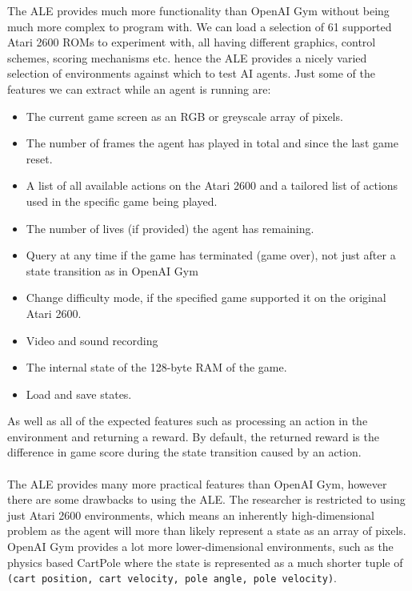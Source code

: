 The ALE provides much more functionality than OpenAI Gym without being much more complex to program with. We can load a selection of 61 supported Atari 2600 ROMs to experiment with, all having different graphics, control schemes, scoring mechanisms etc. hence the ALE provides a nicely varied selection of environments against which to test AI agents. Just some of the features we can extract while an agent is running are:
\begin{itemize}
    \item The current game screen as an RGB or greyscale array of pixels.
    \item The number of frames the agent has played in total and since the last game reset.
    \item A list of all available actions on the Atari 2600 and a tailored list of actions used in the specific game being played.
    \item The number of lives (if provided) the agent has remaining.
    \item Query at any time if the game has terminated (game over), not just after a state transition as in OpenAI Gym
    \item Change difficulty mode, if the specified game supported it on the original Atari 2600.
    \item Video and sound recording
    \item The internal state of the 128-byte RAM of the game.
    \item Load and save states.
\end{itemize}

As well as all of the expected features such as processing an action in the environment and returning a reward. By default, the returned reward is the difference in game score during the state transition caused by an action. \paragraph{}

The ALE provides many more practical features than OpenAI Gym, however there are some drawbacks to using the ALE. The researcher is restricted to using just Atari 2600 environments, which means an inherently high-dimensional problem as the agent will more than likely represent a state as an array of pixels. OpenAI Gym provides a lot more lower-dimensional environments, such as the physics based CartPole where the state is represented as a much shorter tuple of \texttt{(cart position, cart velocity, pole angle, pole velocity)}.
